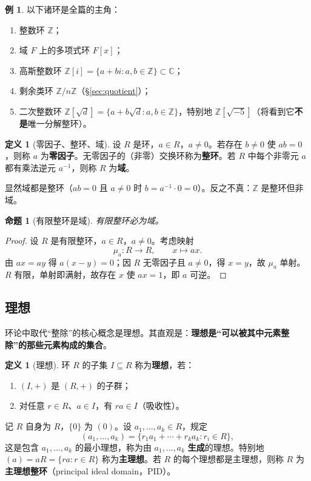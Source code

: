 \documentclass[a4paper,11pt]{ctexart}
\numberwithin{equation}{section}
\theoremstyle{plain}
\newtheorem{proposition}[theorem]{命题}
\theoremstyle{definition}
\newtheorem{definition}[theorem]{定义}
\newtheorem{example}[theorem]{例}
\theoremstyle{remark}
\newcommand{\Z}{\mathbb{Z}}
\newcommand{\Cc}{\mathbb{C}}
\newcommand{\Ga}{\mathbb{Z}[i]}
\newcommand{\Gf}{\mathbb{Z}[\sqrt{-5}]}
\begin{document}
\begin{example}\label{ex:rings}
以下诸环是全篇的主角：
\begin{enumerate}[itemsep=0.1em]
  \item 整数环 $\Z$；
  \item 域 $F$ 上的多项式环 $F[x]$；
  \item 高斯整数环 $\Ga=\{a+bi : a,b\in\Z\}\subset\Cc$；
  \item 剩余类环 $\Z/n\Z$（\S\ref{sec:quotient}）；
  \item 二次整数环 $\Z[\sqrt{d}]=\{a+b\sqrt d : a,b\in\Z\}$，特别地 $\Gf$（将看到它\textbf{不是}唯一分解整环）。
\end{enumerate}
\end{example}

\begin{definition}[零因子、整环、域]\label{def:domain}
设 $R$ 是环，$a\in R$，$a\neq 0$。若存在 $b\neq 0$ 使 $ab=0$，则称 $a$ 为\textbf{零因子}。无零因子的（非零）交换环称为\textbf{整环}。若 $R$ 中每个非零元 $a$ 都有乘法逆元 $a^{-1}$，则称 $R$ 为\textbf{域}。
\end{definition}

显然域都是整环（$ab=0$ 且 $a\neq 0$ 时 $b=a^{-1}\cdot 0=0$）。反之不真：$\Z$ 是整环但非域。

\begin{proposition}[有限整环是域]\label{prop:finitedomain}
有限整环必为域。
\end{proposition}

\begin{proof}
设 $R$ 是有限整环，$a\in R$，$a\neq 0$。考虑映射
\[
\mu_a\colon R\to R,\qquad x\mapsto ax .
\]
由 $ax=ay$ 得 $a(x-y)=0$；因 $R$ 无零因子且 $a\neq 0$，得 $x=y$，故 $\mu_a$ 单射。$R$ 有限，单射即满射，故存在 $x$ 使 $ax=1$，即 $a$ 可逆。
\end{proof}

\subsection{理想}

环论中取代“整除”的核心概念是理想。其直观是：\textbf{理想是“可以被其中元素整除”的那些元素构成的集合}。

\begin{definition}[理想]\label{def:ideal}
环 $R$ 的子集 $I\subseteq R$ 称为\textbf{理想}，若：
\begin{enumerate}[itemsep=0.1em]
  \item $(I,+)$ 是 $(R,+)$ 的子群；
  \item 对任意 $r\in R$、$a\in I$，有 $ra\in I$（吸收性）。
\end{enumerate}
记 $R$ 自身为 $R$，$\{0\}$ 为 $(0)$。设 $a_1,\dots,a_k\in R$，规定
\[
(a_1,\dots,a_k)=\{r_1a_1+\cdots+r_ka_k : r_i\in R\},
\]
这是包含 $a_1,\dots,a_k$ 的最小理想，称为由 $a_1,\dots,a_k$ \textbf{生成}的理想。特别地 $(a)=aR=\{ra:r\in R\}$ 称为\textbf{主理想}。若 $R$ 的每个理想都是主理想，则称 $R$ 为\textbf{主理想整环}（principal ideal domain，PID）。
\end{definition}
\end{document}
